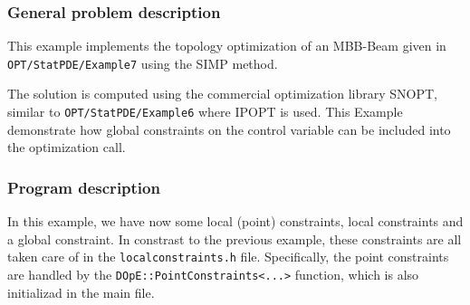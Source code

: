 \subsubsection{General problem description}
This example implements the topology optimization of an MBB-Beam given in \\
\texttt{OPT/StatPDE/Example7} using the SIMP method.

The solution is computed using the commercial optimization library SNOPT, similar 
to \texttt{OPT/StatPDE/Example6} where IPOPT is used. 
This Example demonstrate how global constraints on
the control variable can be included into the optimization call.

\subsubsection{Program description}
In this example, we have now some local (point) constraints, local constraints and a global
constraint. In constrast to the previous example, these 
constraints are all taken care of in the 
\texttt{localconstraints.h} file. 
Specifically, the point constraints are handled by the 
\texttt{DOpE::PointConstraints<...>} function, which is also initializad 
in the main file. 


